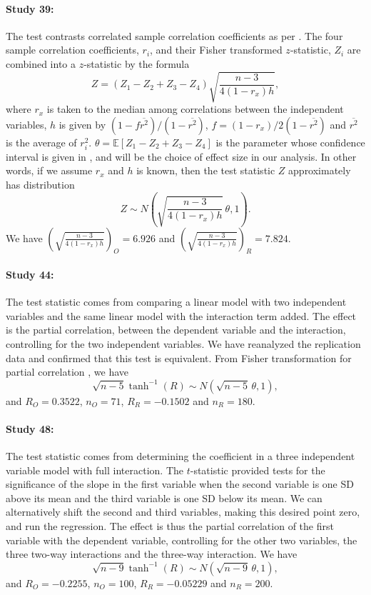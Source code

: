 \documentclass[11pt]{article}
\theoremstyle{definition}
\theoremstyle{custom}
\newcommand{\EE}{\mathbb{E}}
\begin{document}
  \paragraph{Study 39: \citet{Pleskac:2008de}}
  The test contrasts correlated sample correlation coefficients as per \citet{Meng:1992vq}. The four sample correlation coefficients, $r_i$, and their Fisher transformed $z$-statistic, $Z_i$ are combined into a $z$-statistic by the formula
  \[
  Z = (Z_1 - Z_2 + Z_3 - Z_4) \sqrt{\frac{n - 3}{4 (1 - r_x) h}},
  \]
  where $r_x$ is taken to the median among correlations between the independent variables, $h$ is given by $(1 - f \overline{r^2}) / (1 - \overline{r^2})$, $f = (1 - r_x) / 2 (1 - \overline{r^2})$ and $\overline{r^2}$ is the average of $r_i^2$. $\theta = \EE[Z_1 - Z_2 + Z_3 - Z_4]$ is the parameter whose confidence interval is given in \citet{Meng:1992vq}, and will be the choice of effect size in our analysis. In other words, if we assume $r_x$ and $h$ is known, then the test statistic $Z$ approximately has distribution
  \[
  Z \sim N\left(\sqrt{\frac{n - 3}{4 (1 - r_x) h}} \,\theta, 1\right).
  \]
  We have $\left(\sqrt{\frac{n - 3}{4 (1 - r_x) h}}\right)_O = 6.926$ and $\left(\sqrt{\frac{n - 3}{4 (1 - r_x) h}}\right)_R = 7.824$.

  \paragraph{Study 44: \citet{Payne:2008bf}}
  The test statistic comes from comparing a linear model with two independent variables and the same linear model with the interaction term added. The effect is the partial correlation, between the dependent variable and the interaction, controlling for the two independent variables. We have reanalyzed the replication data and confirmed that this test is equivalent. From Fisher transformation for partial correlation \citep{Fisher:1924ve}, we have
  \[
  \sqrt{n - 5} \tanh^{-1}(R) \sim N(\sqrt{n - 5} \,\theta, 1),
  \]
  and $R_O = 0.3522$, $n_O = 71$, $R_R = -0.1502$ and $n_R = 180$.

  \paragraph{Study 48: \citet{Cox:2008gt}}
  The test statistic comes from determining the coefficient in a three independent variable model with full interaction. The $t$-statistic provided tests for the significance of the slope in the first variable when the second variable is one SD above its mean and the third variable is one SD below its mean. We can alternatively shift the second and third variables, making this desired point zero, and run the regression. The effect is thus the partial correlation of the first variable with the dependent variable, controlling for the other two variables, the three two-way interactions and the three-way interaction. We have
  \[
  \sqrt{n - 9} \tanh^{-1}(R) \sim N(\sqrt{n - 9} \,\theta, 1),
  \]
  and $R_O = -0.2255$, $n_O = 100$, $R_R = -0.05229$ and $n_R = 200$.
\end{document}
